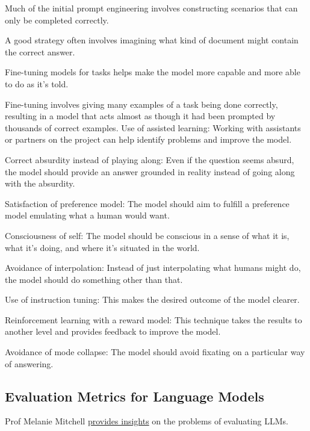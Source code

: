 Much of the initial prompt engineering involves constructing scenarios that can only be completed correctly.

A good strategy often involves imagining what kind of document might contain the correct answer.

Fine-tuning models for tasks helps make the model more capable and more able to do as it's told.

Fine-tuning involves giving many examples of a task being done correctly, resulting in a model that acts almost as though it had been prompted by thousands of correct examples.
Use of assisted learning: Working with assistants or partners on the project can help identify problems and improve the model.

Correct absurdity instead of playing along: Even if the question seems absurd, the model should provide an answer grounded in reality instead of going along with the absurdity.

Satisfaction of preference model: The model should aim to fulfill a preference model emulating what a human would want.

Consciousness of self: The model should be conscious in a sense of what it is, what it's doing, and where it's situated in the world.

Avoidance of interpolation: Instead of just interpolating what humans might do, the model should do something other than that.

Use of instruction tuning: This makes the desired outcome of the model clearer.

Reinforcement learning with a reward model: This technique takes the results to another level and provides feedback to improve the model.

Avoidance of mode collapse: The model should avoid fixating on a particular way of answering.

\subsection{Evaluation Metrics for Language Models}

Prof Melanie Mitchell \href{https://www.pnas.org/doi/10.1073/pnas.2215907120}{provides insights} on the problems of evaluating LLMs.


